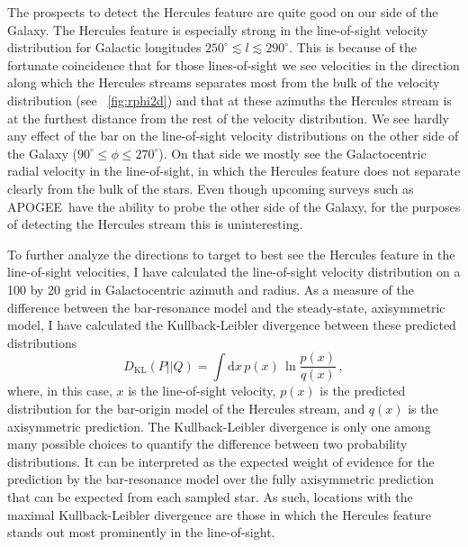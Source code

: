 \documentclass[12pt,preprint]{aastex}
\newcommand{\eg}{e.g.}
\newcommand{\dd}{\mathrm{d}}
\newcommand{\apogee}{APOGEE}
\begin{document}
The prospects to detect the Hercules feature are quite good on our
side of the Galaxy. The Hercules feature is especially strong in the
line-of-sight velocity distribution for Galactic longitudes
$250^{\circ} \lesssim l \lesssim 290^{\circ}$. This is because of the
fortunate coincidence that for those lines-of-sight we see velocities
in the direction along which the Hercules streams separates most from
the bulk of the velocity distribution (see
\figurename~\ref{fig:rphi2d}) and that at these azimuths the Hercules
stream is at the furthest distance from the rest of the velocity
distribution. We see hardly any effect of the bar on the line-of-sight
velocity distributions on the other side of the Galaxy ($90^{\circ}
\leq \phi \leq 270^{\circ}$). On that side we mostly see the
Galactocentric radial velocity in the line-of-sight, in which the
Hercules feature does not separate clearly from the bulk of the
stars. Even though upcoming surveys such as \apogee\ have the ability
to probe the other side of the Galaxy, for the purposes of detecting
the Hercules stream this is uninteresting.

To further analyze the directions to target to best see the Hercules
feature in the line-of-sight velocities, I have calculated the
line-of-sight velocity distribution on a 100 by 20 grid in
Galactocentric azimuth and radius. As a measure of the difference
between the bar-resonance model and the steady-state, axisymmetric
model, I have calculated the Kullback-Leibler divergence between these
predicted distributions \citep[\eg,][]{mackay}
\begin{equation}
D_{\text{KL}}(P||Q) = \int \dd x\,p(x)\,\ln \frac{p(x)}{q(x)}\,,
\end{equation}
where, in this case, $x$ is the line-of-sight velocity, $p(x)$ is the
predicted distribution for the bar-origin model of the Hercules
stream, and $q(x)$ is the axisymmetric prediction. The
Kullback-Leibler divergence is only one among many possible choices to
quantify the difference between two probability distributions. It can
be interpreted as the expected weight of evidence for the prediction
by the bar-resonance model over the fully axisymmetric prediction that
can be expected from each sampled star. As such, locations with the
maximal Kullback-Leibler divergence are those in which the Hercules
feature stands out most prominently in the line-of-sight.
\end{document}
